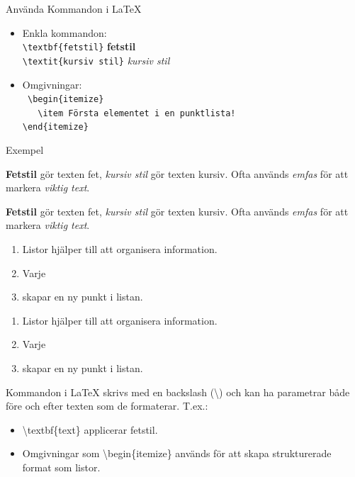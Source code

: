 \begin{Slide}{Använda Kommandon i LaTeX}

\begin{itemize}
  \begin{itemize}
    \item Enkla kommandon: \\
    \texttt{\textbackslash textbf\{fetstil\}} \hfill \textbf{fetstil}\\
    \texttt{\textbackslash textit\{kursiv stil\}}  \hfill \textit{kursiv stil}
    \item Omgivningar:\\ 
    \texttt{
    \textbackslash begin\{itemize\} \\
    ~~~\textbackslash item Första elementet i en punktlista! \\
    \textbackslash end\{itemize\}
    }
  \end{itemize}
\end{itemize}
\end{Slide}

\begin{Slide}{Exempel}\SlideFontTiny
\begin{exlatex}
\textbf{Fetstil} gör texten fet, \textit{kursiv stil} gör texten kursiv. Ofta används \emph{emfas} för att markera \emph{viktig text}.  
\end{exlatex}
\textbf{Fetstil} gör texten fet, \textit{kursiv stil} gör texten kursiv. 
Ofta används \emph{emfas} för att markera \emph{viktig text}.  

  \blankline
  \begin{exlatex}
\begin{enumerate}
  \item Listor hjälper till att organisera information.
  \item Varje \item skapar en ny punkt i listan.
\end{enumerate}
  \end{exlatex}
\begin{enumerate}
  \item Listor hjälper till att organisera information.
  \item Varje \item skapar en ny punkt i listan.
\end{enumerate}
  
Kommandon i LaTeX skrivs med en backslash (\textbackslash) och kan ha parametrar både före och efter texten som de formaterar. T.ex.:
\begin{itemize}
  \item \textbackslash textbf\{text\} applicerar fetstil.
  \item Omgivningar som \textbackslash begin\{itemize\} används för att skapa strukturerade format som listor.
\end{itemize}
\end{Slide}

